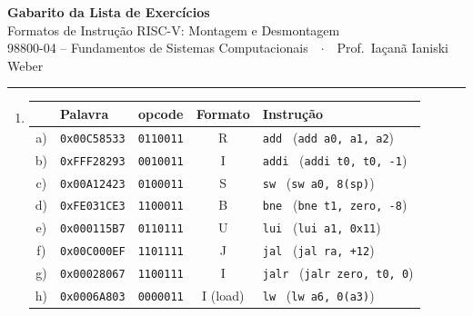 \documentclass[11pt, a4paper]{article}
\begin{document}
\begin{center}
  {\Large \textbf{Gabarito da Lista de Exerc\'{i}cios}}\\[2pt]
  {\large Formatos de Instru\c{c}\~{a}o RISC-V: Montagem e Desmontagem}\\[3pt]
  {\normalsize 98800-04 -- Fundamentos de Sistemas Computacionais\ \ $\cdot$\ \ Prof.\ Ia\c{c}an\~{a} Ianiski Weber}
\end{center}

\vspace{1pt}
\hrule
\vspace{5pt}

\begin{enumerate}

\item \begin{center}
\small
\begin{tabular}{clccl}
\toprule
& \textbf{Palavra} & \textbf{opcode} & \textbf{Formato} & \textbf{Instru\c{c}\~{a}o}\\
\midrule
a) & \texttt{0x00C58533} & \texttt{0110011} & R & \texttt{add} \ (\texttt{add a0, a1, a2})\\
b) & \texttt{0xFFF28293} & \texttt{0010011} & I & \texttt{addi} \ (\texttt{addi t0, t0, -1})\\
c) & \texttt{0x00A12423} & \texttt{0100011} & S & \texttt{sw} \ (\texttt{sw a0, 8(sp)})\\
d) & \texttt{0xFE031CE3} & \texttt{1100011} & B & \texttt{bne} \ (\texttt{bne t1, zero, -8})\\
e) & \texttt{0x000115B7} & \texttt{0110111} & U & \texttt{lui} \ (\texttt{lui a1, 0x11})\\
f) & \texttt{0x00C000EF} & \texttt{1101111} & J & \texttt{jal} \ (\texttt{jal ra, +12})\\
g) & \texttt{0x00028067} & \texttt{1100111} & I & \texttt{jalr} \ (\texttt{jalr zero, t0, 0})\\
h) & \texttt{0x0006A803} & \texttt{0000011} & I (load) & \texttt{lw} \ (\texttt{lw a6, 0(a3)})\\
\bottomrule
\end{tabular}
\end{center}


\end{enumerate}
\end{document}
